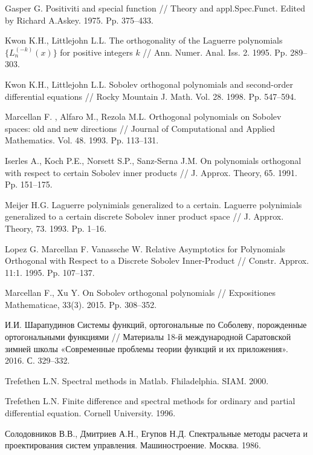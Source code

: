 \begin{thebibliography}{111}
{Gasper G.}
 Positiviti and special function
// Theory and appl.Spec.Funct. Edited by Richard A.Askey. 1975. Pp. 375--433.


{Kwon K.H., Littlejohn L.L.}
 The orthogonality of the Laguerre polynomials $\{L_n^{(-k)}(x)\}$ for positive integers $k$
// Ann. Numer. Anal. Iss. 2. 1995. Pp. 289--303.


{Kwon K.H., Littlejohn L.L.}
 Sobolev orthogonal polynomials and second-order differential equations
// Rocky Mountain J. Math. Vol. 28. 1998. Pp. 547--594.


{Marcellan F. , Alfaro M., Rezola M.L.} Orthogonal polynomials on Sobolev spaces: old and new directions
// Journal of Computational and Applied Mathematics. Vol. 48. 1993. Pp. 113--131.


{ Iserles A., Koch P.E., Norsett S.P., Sanz-Serna J.M.}
 On polynomials  orthogonal  with respect  to certain Sobolev inner products
// J. Approx. Theory, 65. 1991. Pp. 151--175.


{Meijer H.G.} Laguerre polynimials generalized to a certain.
Laguerre polynimials generalized to a certain discrete Sobolev inner product space
// J. Approx. Theory, 73. 1993. Pp. 1--16.


{Lopez G. Marcellan F. Vanassche W.}
 Relative Asymptotics for Polynomials Orthogonal with Respect to a Discrete Sobolev Inner-Product
// Constr. Approx. 11:1. 1995. Pp. 107--137.


{Marcellan F., Xu Y.}
 On Sobolev orthogonal polynomials
// Expositiones Mathematicae, 33(3). 2015. Pp. 308--352.


И.И. Шарапудинов
 Системы функций, ортогональные по Соболеву, порожденные ортогональными функциями
// Материалы 18-й международной Саратовской зимней школы «Современные проблемы теории функций и их приложения». 2016. С. 329--332.


{Trefethen  L.N.} Spectral methods in Matlab. Fhiladelphia. SIAM. 2000.


{Trefethen  L.N.}
Finite difference and spectral methods for ordinary and partial differential equation. Cornell University. 1996.


{Солодовников В.В., Дмитриев А.Н., Егупов Н.Д.}
Спектральные методы расчета и проектирования систем управления. Машиностроение. Москва. 1986.



\end{thebibliography}
